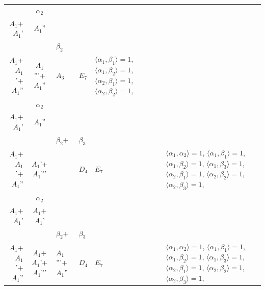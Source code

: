 \documentclass[12pt]{report}
\begin{document}
\begin{appendix}
{\begin{longtable}{rcl p{1cm}p{1cm}p{3cm} }
\\
\begin{tabular}{cc}$\alpha_1$+ & $\alpha_2$\\\tiny{ $A_1$+$A_1$' } & \tiny{ $A_1$'' }\end{tabular} &\begin{tabular}{c} = \\~ \end{tabular} & \begin{tabular}{cc}$\beta_1$+ & $\beta_2$\\\tiny{ $A_1$+$A_1$'+$A_1$'' } & \tiny{ $A_1$'''+$A_1$'' }\end{tabular} & $A_3$ & $E_7$ &  $\langle\alpha_1, \beta_1\rangle=1$, $\langle\alpha_1, \beta_2\rangle=1$, $\langle\alpha_2, \beta_1\rangle=1$, $\langle\alpha_2, \beta_2\rangle=1$, 
\\
\begin{tabular}{cc}$\alpha_1$+ & $\alpha_2$\\\tiny{ $A_1$+$A_1$' } & \tiny{ $A_1$'' }\end{tabular} &\begin{tabular}{c} = \\~ \end{tabular} & \begin{tabular}{ccc}$\beta_1$+ & $\beta_2$+ & $\beta_3$\\\tiny{ $A_1$+$A_1$'+$A_1$'' } & \tiny{ $A_1$'+$A_1$''' } & \tiny{  }\end{tabular} & $D_4$ & $E_7$ & $\langle\alpha_1, \alpha_2\rangle=1$,  $\langle\alpha_1, \beta_1\rangle=1$, $\langle\alpha_1, \beta_2\rangle=1$, $\langle\alpha_1, \beta_3\rangle=1$, $\langle\alpha_2, \beta_1\rangle=1$, $\langle\alpha_2, \beta_2\rangle=1$, $\langle\alpha_2, \beta_3\rangle=1$, 
\\
\begin{tabular}{cc}$\alpha_1$+ & $\alpha_2$\\\tiny{ $A_1$+$A_1$' } & \tiny{ $A_1$+$A_1$' }\end{tabular} &\begin{tabular}{c} = \\~ \end{tabular} & \begin{tabular}{ccc}$\beta_1$+ & $\beta_2$+ & $\beta_3$\\\tiny{ $A_1$+$A_1$'+$A_1$'' } & \tiny{ $A_1$+$A_1$'+$A_1$''' } & \tiny{ $A_1$'''+$A_1$'' }\end{tabular} & $D_4$ & $E_7$ & $\langle\alpha_1, \alpha_2\rangle=1$,  $\langle\alpha_1, \beta_1\rangle=1$, $\langle\alpha_1, \beta_2\rangle=1$, $\langle\alpha_1, \beta_3\rangle=1$, $\langle\alpha_2, \beta_1\rangle=1$, $\langle\alpha_2, \beta_2\rangle=1$, $\langle\alpha_2, \beta_3\rangle=1$, 

\end{longtable}}
\end{appendix}
\end{document}
